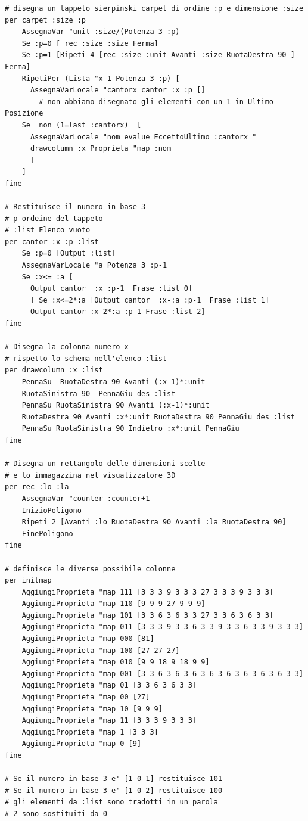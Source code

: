 \begin{lstlisting}[frame=single]
# disegna un tappeto sierpinski carpet di ordine :p e dimensione :size
per carpet :size :p
	AssegnaVar "unit :size/(Potenza 3 :p)
	Se :p=0 [ rec :size :size Ferma]
	Se :p=1 [Ripeti 4 [rec :size :unit Avanti :size RuotaDestra 90 ] Ferma]
	RipetiPer (Lista "x 1 Potenza 3 :p) [
	  AssegnaVarLocale "cantorx cantor :x :p []
		# non abbiamo disegnato gli elementi con un 1 in Ultimo Posizione
	Se  non (1=last :cantorx)  [
	  AssegnaVarLocale "nom evalue EccettoUltimo :cantorx "
	  drawcolumn :x Proprieta "map :nom
	  ]
	]  
fine

# Restituisce il numero in base 3
# p ordeine del tappeto
# :list Elenco vuoto
per cantor :x :p :list
	Se :p=0 [Output :list] 
	AssegnaVarLocale "a Potenza 3 :p-1
	Se :x<= :a [
	  Output cantor  :x :p-1  Frase :list 0] 
	  [ Se :x<=2*:a [Output cantor  :x-:a :p-1  Frase :list 1] 
	  Output cantor :x-2*:a :p-1 Frase :list 2]
fine

# Disegna la colonna numero x
# rispetto lo schema nell'elenco :list
per drawcolumn :x :list
	PennaSu  RuotaDestra 90 Avanti (:x-1)*:unit 
	RuotaSinistra 90  PennaGiu des :list
	PennaSu RuotaSinistra 90 Avanti (:x-1)*:unit 
	RuotaDestra 90 Avanti :x*:unit RuotaDestra 90 PennaGiu des :list
	PennaSu RuotaSinistra 90 Indietro :x*:unit PennaGiu
fine

# Disegna un rettangolo delle dimensioni scelte
# e lo immagazzina nel visualizzatore 3D
per rec :lo :la
	AssegnaVar "counter :counter+1
	InizioPoligono
	Ripeti 2 [Avanti :lo RuotaDestra 90 Avanti :la RuotaDestra 90]
	FinePoligono
fine

# definisce le diverse possibile colonne
per initmap
	AggiungiProprieta "map 111 [3 3 3 9 3 3 3 27 3 3 3 9 3 3 3]
	AggiungiProprieta "map 110 [9 9 9 27 9 9 9]
	AggiungiProprieta "map 101 [3 3 6 3 6 3 3 27 3 3 6 3 6 3 3]
	AggiungiProprieta "map 011 [3 3 3 9 3 3 6 3 3 9 3 3 6 3 3 9 3 3 3]
	AggiungiProprieta "map 000 [81]
	AggiungiProprieta "map 100 [27 27 27]
	AggiungiProprieta "map 010 [9 9 18 9 18 9 9]
	AggiungiProprieta "map 001 [3 3 6 3 6 3 6 3 6 3 6 3 6 3 6 3 6 3 3]
	AggiungiProprieta "map 01 [3 3 6 3 6 3 3]
	AggiungiProprieta "map 00 [27]
	AggiungiProprieta "map 10 [9 9 9]
	AggiungiProprieta "map 11 [3 3 3 9 3 3 3]
	AggiungiProprieta "map 1 [3 3 3]
	AggiungiProprieta "map 0 [9]
fine

# Se il numero in base 3 e' [1 0 1] restituisce 101
# Se il numero in base 3 e' [1 0 2] restituisce 100
# gli elementi da :list sono tradotti in un parola
# 2 sono sostituiti da 0


\end{lstlisting}
